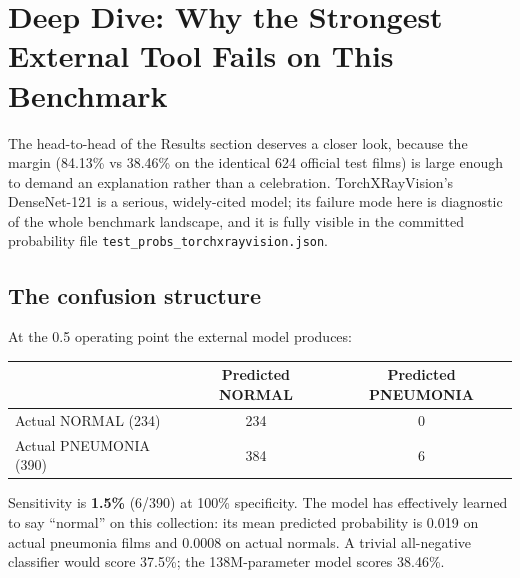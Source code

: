 \section{Deep Dive: Why the Strongest External Tool Fails on This Benchmark}
\label{sec:tooldeepdive}
The head-to-head of the Results section deserves a closer look,
because the margin (84.13\% vs 38.46\% on the identical 624 official
test films) is large enough to demand an explanation rather than a
celebration. TorchXRayVision's DenseNet-121 is a serious, widely-cited
model; its failure mode here is diagnostic of the whole benchmark
landscape, and it is fully visible in the committed probability file
\texttt{test\_probs\_torchxrayvision.json}.
\subsection{The confusion structure}
At the 0.5 operating point the external model produces:
\begin{center}
\begin{tabular}{lcc}
\hline
 & Predicted NORMAL & Predicted PNEUMONIA \\
\hline
Actual NORMAL (234) & 234 & 0 \\
Actual PNEUMONIA (390) & 384 & 6 \\
\hline
\end{tabular}
\end{center}
Sensitivity is \textbf{1.5\%} (6/390) at 100\% specificity. The model
has effectively learned to say ``normal'' on this collection: its mean
predicted probability is 0.019 on actual pneumonia films and 0.0008 on
actual normals. A trivial all-negative classifier would score 37.5\%;
the 138M-parameter model scores 38.46\%.
